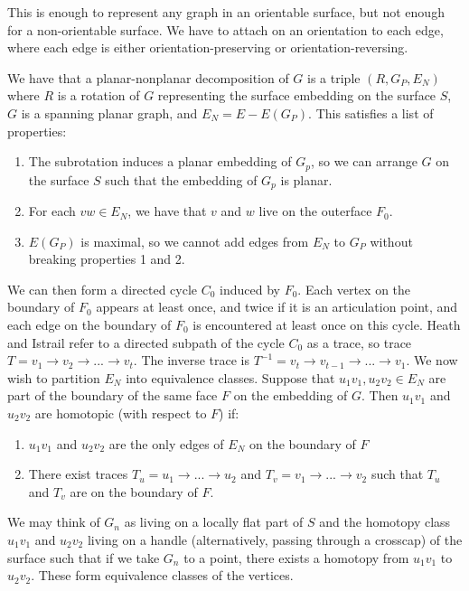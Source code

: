 \documentclass[]{article}
\theoremstyle{definition}
\numberwithin{theorem}{section}
\numberwithin{equation}{section}
\begin{document}
This is enough to represent any graph in an orientable surface, but not enough for a non-orientable surface. We have to attach on an orientation to each edge, where each edge is either orientation-preserving or orientation-reversing. 

We have that a planar-nonplanar decomposition of $G$ is a triple $(R, G_P, E_N)$ where $R$ is a rotation of $G$ representing the surface embedding on the surface $S$, $G$ is a spanning planar graph, and $E_N = E - E(G_P)$. 
This satisfies a list of properties:
\begin{enumerate}
	\item The subrotation induces a planar embedding of $G_p$, so we can arrange $G$ on the surface $S$ such that the embedding of $G_p$ is planar. 
	\item For each $vw \in E_N$, we have that $v$ and $w$ live on the outerface $F_0$.
	\item $E(G_P)$ is maximal, so we cannot add edges from $E_N$ to $G_P$ without breaking properties 1 and 2. 
\end{enumerate}

We can then form a directed cycle $C_0$ induced by $F_0$. Each vertex on the boundary of $F_0$ appears at least once, and twice if it is an articulation point, and each edge on the boundary of $F_0$ is encountered at least once on this cycle. Heath and Istrail refer to a directed subpath of the cycle $C_0$ as a trace, so trace $T = v_1 \rightarrow v_2 \rightarrow ... \rightarrow v_t$. The inverse trace is $T^{-1} = v_t \rightarrow v_{t-1} \rightarrow ... \rightarrow v_1$. We now wish to partition $E_N$ into equivalence classes. Suppose that $u_1v_1, u_2v_2 \in E_N$ are part of the boundary of the same face $F$ on the embedding of $G$. Then $u_1v_1$ and $u_2v_2$ are homotopic (with respect to $F$) if:
\begin{enumerate}
	\item $u_1v_1$ and $u_2v_2$ are the only edges of $E_N$ on the boundary of $F$
	\item There exist traces $T_u = u_1 \rightarrow ... \rightarrow u_2$ and $T_v = v_1 \rightarrow ... \rightarrow v_2$ such that $T_u$ and $T_v$ are on the boundary of $F$.
\end{enumerate}
We may think of $G_n$ as living on a locally flat part of $S$ and the homotopy class $u_1v_1$ and $u_2 v_2$ living on a handle (alternatively, passing through a crosscap) of the surface such that if we take $G_n$ to a point, there exists a homotopy from $u_1v_1$ to $u_2v_2$. These form equivalence classes of the vertices.
\end{document}
